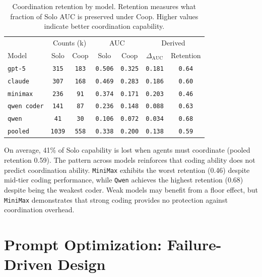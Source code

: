 \begin{table}[htbp]
  \centering
  \caption{Coordination retention by model. Retention measures what fraction of Solo AUC is preserved under Coop. Higher values indicate better coordination capability.}
  \begin{tabular}{l|cc|cc|cc}
    \toprule
    & \multicolumn{2}{c|}{Counts (k)} & \multicolumn{2}{c|}{AUC} & \multicolumn{2}{c}{Derived} \\
    Model & Solo & Coop & Solo & Coop & $\Delta_{\mathrm{AUC}}$ & Retention \\
    \midrule
    \texttt{gpt-5}      & \texttt{315}   & \texttt{183}  & \texttt{0.506} & \texttt{0.325} & \texttt{0.181} & \texttt{0.64} \\
    \texttt{claude}     & \texttt{307}   & \texttt{168}  & \texttt{0.469} & \texttt{0.283} & \texttt{0.186} & \texttt{0.60} \\
    \texttt{minimax}    & \texttt{236}   & \texttt{91}   & \texttt{0.374} & \texttt{0.171} & \texttt{0.203} & \texttt{0.46} \\
    \texttt{qwen coder} & \texttt{141}   & \texttt{87}   & \texttt{0.236} & \texttt{0.148} & \texttt{0.088} & \texttt{0.63} \\
    \texttt{qwen}       & \texttt{41}    & \texttt{30}   & \texttt{0.106} & \texttt{0.072} & \texttt{0.034} & \texttt{0.68} \\
    \midrule
    \texttt{pooled}     & \texttt{1039} & \texttt{558} & \texttt{0.338} & \texttt{0.200} & \texttt{0.138} & \texttt{0.59} \\
    \bottomrule
  \end{tabular}
  \label{tab:auc_gap_rel_diff}
\end{table}

On average, 41\% of Solo capability is lost when agents must coordinate (pooled retention 0.59). The pattern across models reinforces that coding ability does not predict coordination ability. \texttt{MiniMax} exhibits the worst retention (0.46) despite mid-tier coding performance, while \texttt{Qwen} achieves the highest retention (0.68) despite being the weakest coder. Weak models may benefit from a floor effect, but \texttt{MiniMax} demonstrates that strong coding provides no protection against coordination overhead.



\section{Prompt Optimization: Failure-Driven Design}
\label{app:prompt_optimization}

